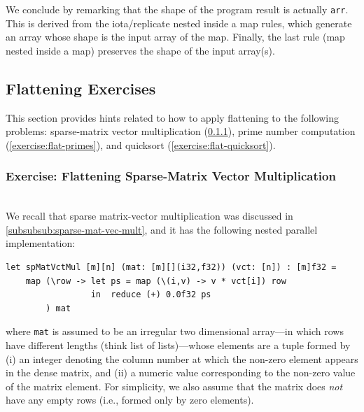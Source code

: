 \documentclass[acmsmall,review]{acmart}\settopmatter{printfolios=true,printccs=false,printacmref=false}
\begin{document}
We conclude by remarking that the shape of the program result is actually 
{\tt arr}. This is derived from the iota/replicate nested inside a map rules,
which generate an array whose shape is the input array of the map. Finally,
the last rule (map nested inside a map) preserves the shape of the input array(s).

\subsection{Flattening Exercises}
\label{subsec:flat-exercises}

This section provides hints related to how to apply flattening to the following 
problems: sparse-matrix vector multiplication (\cref{exercise:flat-sp-mat-vec-mul}), 
prime number computation (\cref{exercise:flat-primes}), and 
quicksort (\cref{exercise:flat-quicksort}).

\subsubsection{Exercise: Flattening Sparse-Matrix Vector Multiplication}
\label{exercise:flat-sp-mat-vec-mul}
$\mbox{ }$\\

We recall that sparse matrix-vector multiplication was discussed in 
\cref{subsubsub:sparse-mat-vec-mult}, and it has the following nested
parallel implementation:
\begin{lstlisting}[mathescape=true]
let spMatVctMul [m][n] (mat: [m][](i32,f32)) (vct: [n]) : [m]f32 =
    map (\row -> let ps = map (\(i,v) -> v * vct[i]) row
                 in  reduce (+) 0.0f32 ps 
        ) mat
\end{lstlisting}\vspace{-2ex}
where {\tt mat} is assumed to be an irregular two dimensional array---in
which rows have different lengths (think list of lists)---whose elements
are a tuple formed by (i) an integer denoting the column number at which 
the non-zero element appears in the dense matrix, and (ii) a numeric value
corresponding to the non-zero value of the matrix element. For simplicity,
we also assume that the matrix does \emph{not} have any empty rows 
(i.e., formed only by zero elements).
\end{document}
